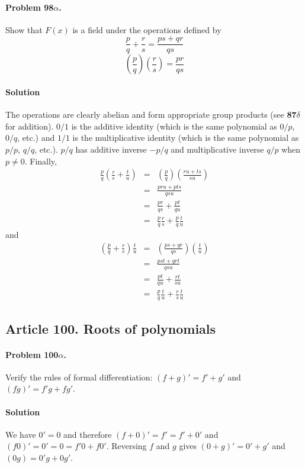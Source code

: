 \paragraph{Problem 98$\alpha$.}
Show that $F(x)$ is a field under the operations defined by
$$\frac{p}{q} + \frac{r}{s} = \frac{ps+qr}{qs}$$
$$\left(\frac{p}{q}\right)\left(\frac{r}{s}\right) = \frac{pr}{qs}$$

\paragraph*{Solution}
The operations are clearly abelian and form appropriate group products (see
\textbf{87$\delta$} for addition). $0/1$ is the additive identity (which is
the same polynomial as $0/p$, $0/q$, etc.) and $1/1$ is the multiplicative identity
(which is the same polynomial as $p/p$, $q/q$, etc.). $p/q$ has additive inverse
$-p/q$ and multiplicative inverse $q/p$ when $p \neq 0$. Finally,
\begin{eqnarray*}
\frac{p}{q}\left(\frac{r}{s} + \frac{t}{u}\right) & = &
    \left(\frac{p}{q}\right)\left(\frac{ru+ts}{su}\right) \\
& = & \frac{pru+pts}{qsu} \\
& = & \frac{pr}{qs} + \frac{pt}{qu} \\
& = & \frac{p}{q}\frac{r}{s} + \frac{p}{q}\frac{t}{u}
\end{eqnarray*}
and
\begin{eqnarray*}
\left(\frac{p}{q}+\frac{r}{s}\right)\frac{t}{u} & = &
    \left(\frac{ps+qr}{qs}\right)\left(\frac{t}{u}\right) \\
& = & \frac{pst+qrt}{qsu} \\
& = & \frac{pt}{qu} + \frac{rt}{su} \\
& = & \frac{p}{q}\frac{t}{u} + \frac{r}{s}\frac{t}{u}
\end{eqnarray*}

\subsection{Article 100. Roots of polynomials}

\paragraph{Problem 100$\alpha$.}
Verify the rules of formal differentiation: $(f+g)' = f' + g'$ and $(fg)' =
f'g + fg'$.

\paragraph*{Solution}
We have $0' = 0$ and therefore $(f+0)' = f' = f' + 0'$ and $(f0)' = 0' = 0 =
f'0 + f0'$. Reversing $f$ and $g$ gives $(0 + g)' = 0' + g'$ and $(0g) = 0'g + 0g'$.

